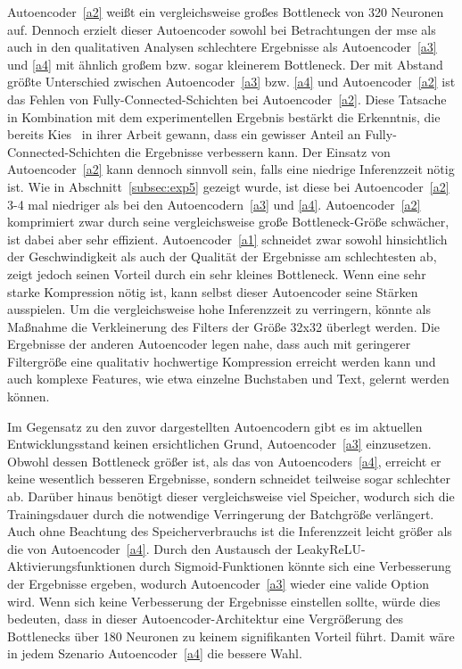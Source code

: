 Autoencoder~\ref{a2} weißt ein vergleichsweise großes Bottleneck von 320 Neuronen auf. Dennoch erzielt dieser Autoencoder sowohl bei Betrachtungen der \gls{mse} als auch in den qualitativen Analysen schlechtere Ergebnisse als Autoencoder~\ref{a3} und \ref{a4} mit ähnlich großem bzw. sogar kleinerem Bottleneck. Der mit Abstand größte Unterschied zwischen Autoencoder~\ref{a3} bzw. \ref{a4} und Autoencoder~\ref{a2} ist das Fehlen von Fully-Connected-Schichten bei Autoencoder~\ref{a2}. Diese Tatsache in Kombination mit dem experimentellen Ergebnis bestärkt die Erkenntnis, die bereits Kies~\cite{kiesEntwicklungUndAnalyse2020} in ihrer Arbeit gewann, dass ein gewisser Anteil an Fully-Connected-Schichten die Ergebnisse verbessern kann.
Der Einsatz von Autoencoder~\ref{a2} kann dennoch sinnvoll sein, falls eine niedrige Inferenzzeit nötig ist. Wie in Abschnitt~\ref{subsec:exp5} gezeigt wurde, ist diese bei Autoencoder~\ref{a2} 3-4 mal niedriger als bei den Autoencodern~\ref{a3} und \ref{a4}. Autoencoder~\ref{a2} komprimiert zwar durch seine vergleichsweise große Bottleneck-Größe schwächer, ist dabei aber sehr effizient.   Autoencoder~\ref{a1} schneidet zwar sowohl hinsichtlich der Geschwindigkeit als auch der Qualität der Ergebnisse am schlechtesten ab, zeigt jedoch seinen Vorteil durch ein sehr kleines Bottleneck. Wenn eine sehr starke Kompression nötig ist, kann selbst dieser Autoencoder seine Stärken ausspielen. Um die vergleichsweise hohe Inferenzzeit zu verringern, könnte als Maßnahme die Verkleinerung des Filters der Größe 32x32 überlegt werden. Die Ergebnisse der anderen Autoencoder legen nahe, dass auch mit geringerer Filtergröße eine qualitativ hochwertige Kompression erreicht werden kann und auch komplexe Features, wie etwa einzelne Buchstaben und Text, gelernt werden können.

Im Gegensatz zu den zuvor dargestellten Autoencodern gibt es im aktuellen Entwicklungsstand keinen ersichtlichen Grund, Autoencoder~\ref{a3} einzusetzen. Obwohl dessen Bottleneck größer ist, als das von Autoencoders~\ref{a4}, erreicht er keine wesentlich besseren Ergebnisse, sondern schneidet teilweise sogar schlechter ab. Darüber hinaus benötigt dieser vergleichsweise viel Speicher, wodurch sich die Trainingsdauer durch die notwendige Verringerung der Batchgröße verlängert. Auch ohne Beachtung des Speicherverbrauchs ist die Inferenzzeit leicht größer als die von Autoencoder~\ref{a4}. Durch den Austausch der LeakyReLU-Aktivierungsfunktionen durch Sigmoid-Funktionen könnte sich eine Verbesserung der Ergebnisse ergeben, wodurch Autoencoder~\ref{a3} wieder eine valide Option wird. Wenn sich keine Verbesserung der Ergebnisse einstellen sollte, würde dies bedeuten, dass in dieser Autoencoder-Architektur eine Vergrößerung des Bottlenecks über 180 Neuronen zu keinem signifikanten Vorteil führt. Damit wäre in jedem Szenario Autoencoder~\ref{a4} die bessere Wahl.

